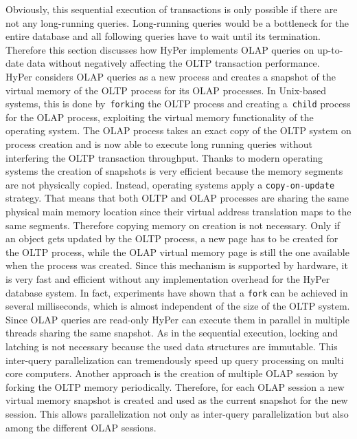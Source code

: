Obviously, this sequential execution of transactions is only possible if there are not any long-running queries. Long-running queries would be a bottleneck for the entire database and all following queries have to wait until its termination. Therefore this section discusses how HyPer implements OLAP queries on up-to-date data without negatively affecting the OLTP transaction performance. 
\\
HyPer considers OLAP queries as a new process and creates a snapshot of the virtual memory of the OLTP process for its OLAP processes. In Unix-based systems, this is done by~\texttt{forking} the OLTP process and creating a~\texttt{child} process for the OLAP process, exploiting the virtual memory functionality of the operating system. The OLAP process takes an exact copy of the OLTP system on process creation and is now able to execute long running queries without interfering the OLTP transaction throughput. Thanks to modern operating systems the creation of snapshots is very efficient because the memory segments are not physically copied. Instead, operating systems apply a \texttt{copy-on-update} strategy. That means that both OLTP and OLAP processes are sharing the same physical main memory location since their virtual address translation maps to the same segments. Therefore copying memory on creation is not necessary. Only if an object gets updated by the OLTP process, a new page has to be created for the OLTP process, while the OLAP virtual memory page is still the one available when the process was created. Since this mechanism is supported by hardware, it is very fast and efficient without any implementation overhead for the HyPer database system. In fact, experiments have shown that a \texttt{fork} can be achieved in several milliseconds, which is almost independent of the size of the OLTP system.
\\
Since OLAP queries are read-only HyPer can execute them in parallel in multiple threads sharing the same snapshot. As in the sequential execution, locking and latching is not necessary because the used data structures are immutable. This inter-query parallelization can tremendously speed up query processing on multi core computers. Another approach is the creation of multiple OLAP session by forking the OLTP memory periodically. Therefore, for each OLAP session a new virtual memory snapshot is created and used as the current snapshot for the new session. This allows parallelization not only as inter-query parallelization but also among the different OLAP sessions.
\\ 
